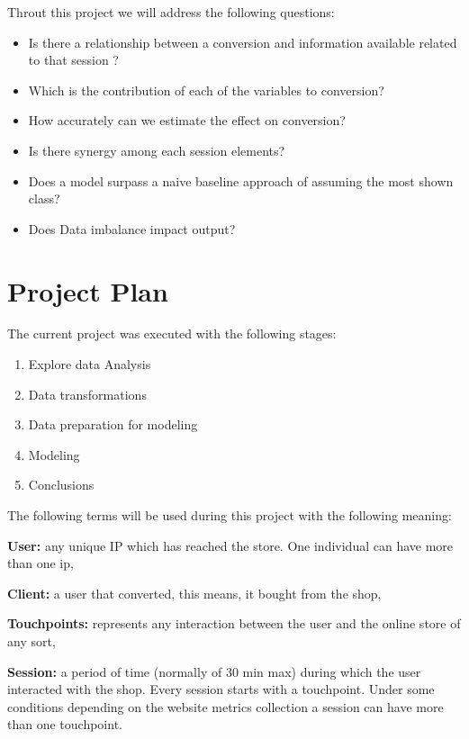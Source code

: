 \documentclass[
]{book}
\providecommand{\tightlist}{%
  \setlength{\itemsep}{0pt}\setlength{\parskip}{0pt}}
\begin{document}
Throut this project we will address the following questions:

\begin{itemize}
\tightlist
\item
  Is there a relationship between a conversion and information available related to that session ?
\item
  Which is the contribution of each of the variables to conversion?
\item
  How accurately can we estimate the effect on conversion?
\item
  Is there synergy among each session elements?
\item
  Does a model surpass a naive baseline approach of assuming the most shown class?
\item
  Does Data imbalance impact output?
\end{itemize}

\hypertarget{project-plan}{%
\section{Project Plan}\label{project-plan}}

The current project was executed with the following stages:

\begin{enumerate}
\def\labelenumi{\arabic{enumi}.}
\tightlist
\item
  Explore data Analysis
\item
  Data transformations
\item
  Data preparation for modeling
\item
  Modeling
\item
  Conclusions
\end{enumerate}

The following terms will be used during this project with the following meaning:

\textbf{User:} any unique IP which has reached the store. One individual can have more than one ip,

\textbf{Client:} a user that converted, this means, it bought from the shop,

\textbf{Touchpoints:} represents any interaction between the user and the online store of any sort,

\textbf{Session:} a period of time (normally of 30 min max) during which the user interacted with the shop. Every session starts with a touchpoint. Under some conditions depending on the website metrics collection a session can have more than one touchpoint.
\end{document}

